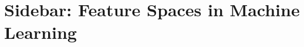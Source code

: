 \section[Feature Spaces in Machine Learning]{Sidebar: Feature Spaces in Machine Learning}\label{sb:featspace}

	